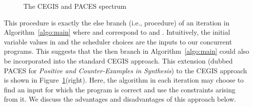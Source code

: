 \documentclass{llncs}
\begin{document}
\begin{figure}
  \begin{minipage}{0.3\textwidth}
  \end{minipage}
  \hfill
  \begin{minipage}{0.6\textwidth}
  \end{minipage}
  \vspace{-2ex}
  \caption{The CEGIS and PACES spectrum}
  \label{fig:cegis}
\end{figure}

This procedure is exactly the else branch (i.e.,  procedure) of
an iteration in Algorithm~\ref{algo:main} where 
and  correspond to  and .
Intuitively, the initial variable values in  and the scheduler
choices are the inputs to our concurrent programs.
This suggests that the then branch in Algorithm~\ref{algo:main} could
also be incorporated into the standard CEGIS approach.
This extension (dubbed PACES for {\em Positive and Counter-Examples 
in Synthesis}) to the CEGIS approach is shown in
Figure~\ref{fig:cegis}(right).
Here, the algorithm in each iteration may choose to find an input for
which the program is correct and use the constraints arising
from it.
We discuss the advantages and disadvantages of this approach below.
\end{document}
